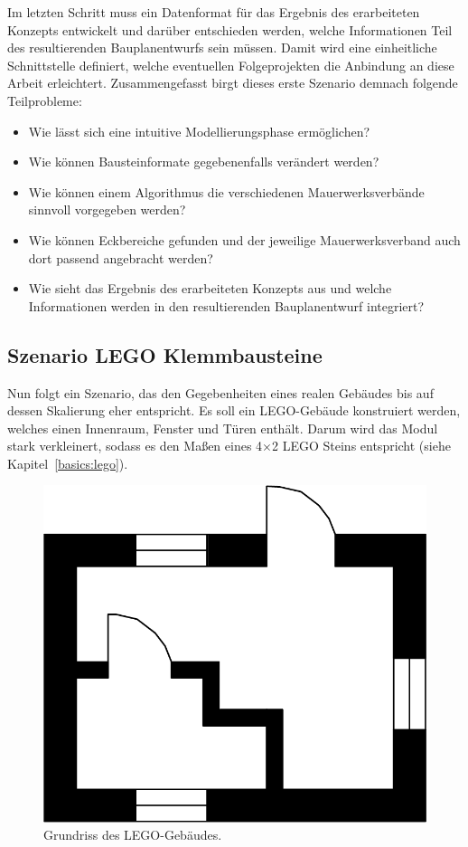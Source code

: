 Im letzten Schritt muss ein Datenformat für das Ergebnis des erarbeiteten Konzepts entwickelt und darüber entschieden werden, welche Informationen Teil des resultierenden Bauplanentwurfs sein müssen.
Damit wird eine einheitliche Schnittstelle definiert, welche eventuellen Folgeprojekten die Anbindung an diese Arbeit erleichtert.
Zusammengefasst birgt dieses erste Szenario demnach folgende Teilprobleme:
\begin{itemize}
  \item Wie lässt sich eine intuitive Modellierungsphase ermöglichen?
  \item Wie können Bausteinformate gegebenenfalls verändert werden?
  \item Wie können einem Algorithmus die verschiedenen Mauerwerksverbände sinnvoll vorgegeben werden?
  \item Wie können Eckbereiche gefunden und der jeweilige Mauerwerksverband auch dort passend angebracht werden?
  \item Wie sieht das Ergebnis des erarbeiteten Konzepts aus und welche Informationen werden in den resultierenden Bauplanentwurf integriert?
\end{itemize}

\subsection{Szenario LEGO Klemmbausteine}\label{scenarios:scenario2}
Nun folgt ein Szenario, das den Gegebenheiten eines realen Gebäudes bis auf dessen Skalierung eher entspricht.
Es soll ein LEGO-Gebäude konstruiert werden, welches einen Innenraum, Fenster und Türen enthält.
Darum wird das Modul stark verkleinert, sodass es den Maßen eines 4$\times$2 LEGO Steins entspricht (siehe Kapitel~\ref{basics:lego}).

\begin{figure}[ht]
  \centering
  \includegraphics[width=0.5\columnwidth]{fig/scenario2_storey_plan.png}
  \caption{Grundriss des LEGO-Gebäudes.}\label{fig:scenarios:Scenario2 Gebaeudeplan}
\end{figure}

